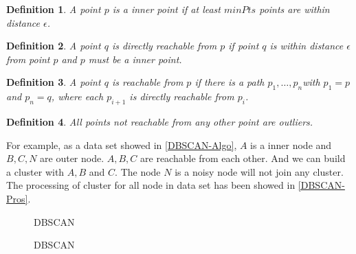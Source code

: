 \documentclass[12pt]{article}
\theoremstyle{plain}
\newtheorem{definition}{\textbf{Definition}}[section]
\begin{document}
\begin{definition}
A point $p$ is a inner point if at least $minPts$ points are within distance $\epsilon$.
\end{definition}
\begin{definition}
A point $q$ is directly reachable from $p$ if point $q$ is within distance $\epsilon$ from point $p$ and $p$ must be a inner point.
\end{definition}
\begin{definition}
A point $q$ is reachable from $p$ if there is a path $p_1, \ldots, p_n $with $p_1 = p$ and $p_n = q$, where each $p_{i+1}$ is directly reachable from $p_i$.
\end{definition}
\begin{definition}
All points not reachable from any other point are outliers.
\end{definition}

For example, as a data set showed in \ref{DBSCAN-Algo}, $A$ is a inner node and $B, C, N$ are outer node. $A, B, C$ are reachable from each other. And we can build a cluster with $A, B$ and $C$. The node $N$ is a noisy node will not join any cluster. 
The processing of cluster for all node in data set has been showed in \ref{DBSCAN-Pros}.

\begin{figure}[H]
\centering
{}
\caption{DBSCAN}
\end{figure}

\begin{figure}[H]
\centering
{}
\caption{DBSCAN}
\end{figure}
\end{document}

